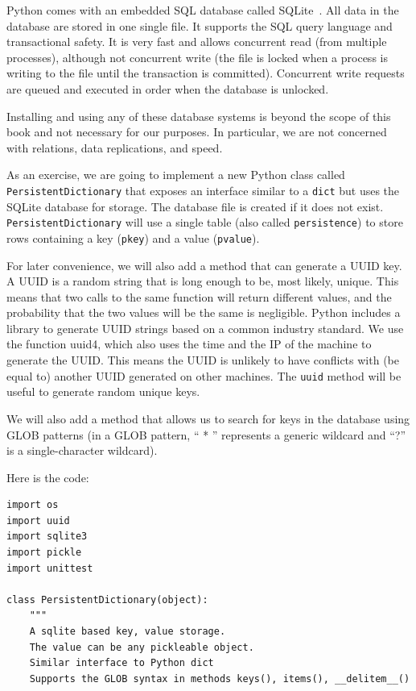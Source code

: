 \documentclass[justified, sixbynine]{tufte-book}
\def\ft{\small\tt}
\theoremstyle{plain}%
\newtheorem * {corollary}{Corollary}
\theoremstyle{definition}
\theoremstyle{remark}
\newtheorem * {remark}{Remark}
\newtheorem * {note}{Note}
\begin{document}
\begin{fullwidth}
Python comes with an embedded SQL database called SQLite~\cite{sqlite}. All data in the database are stored in one single file. It supports the SQL query language and transactional safety. It is very fast and allows concurrent read (from multiple processes), although not concurrent write (the file is locked when a process is writing to the file until the transaction is committed). Concurrent write requests are queued and executed in order when the database is unlocked.

Installing and using any of these database systems is beyond the scope of this book and not necessary for our purposes. In particular, we are not concerned with relations, data replications, and speed.

As an exercise, we are going to implement a new Python class called {\ft PersistentDictionary} that exposes an interface similar to a {\ft dict} but uses the SQLite database for storage. The database file is created if it does not exist. {\ft PersistentDictionary} will use a single table (also called {\ft persistence}) to store rows containing a key ({\ft pkey}) and a value  ({\ft pvalue}).

For later convenience, we will also add a method that can generate a UUID key. A UUID is a random string that is long enough to be, most likely, unique. This means that two calls to the same function will return different values, and the probability that the two values will be the same is negligible. Python includes a library to generate UUID strings based on a common industry standard. We use the function uuid4, which also uses the time and the IP of the machine to generate the UUID. This means the UUID is unlikely to have conflicts with (be equal to) another UUID generated on other machines. The {\ft uuid} method will be useful to generate random unique keys.

We will also add a method that allows us to search for keys in the database using GLOB patterns (in a GLOB pattern, `` * '' represents a generic wildcard and ``?'' is a single-character wildcard).

Here is the code:


\begin{lstlisting}[caption={in file: {\ft nlib.py}}]
import os
import uuid
import sqlite3
import pickle
import unittest

class PersistentDictionary(object):
    """
    A sqlite based key, value storage.
    The value can be any pickleable object.
    Similar interface to Python dict
    Supports the GLOB syntax in methods keys(), items(), __delitem__()


\end{lstlisting}
\end{fullwidth}
\end{document}
